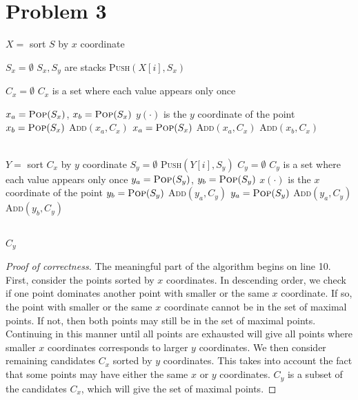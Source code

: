 \documentclass{article}
\begin{document}
\section*{Problem 3}
\begin{algorithm}[H]
\caption{Algorithm to compute the set of maximal points of S}
\begin{algorithmic}[1]
\State $X=$ sort $S$ by $x$ coordinate

\State $S_x=\emptyset$
	\Comment $S_x, S_y$ are stacks
	\State \textsc{Push}$(X[i],S_x)$
\EndFor

\State $C_x=\emptyset$
	\Comment $C_x$ is a set where each value appears only once

	\State $x_a=\textsc{Pop}(S_x)$, $x_b=\textsc{Pop}(S_x)$
		 \Comment $y(\cdot)$ is the $y$ coordinate of the point
			\State $x_b=\textsc{Pop}(S_x)$
		\Else
			\State \textsc{Add}$(x_a, C_x)$
			\State $x_a=\textsc{Pop}(S_x)$
		\EndIf
	\EndWhile
	\State \textsc{Add}$(x_a, C_x)$
		\State \textsc{Add}$(x_b, C_x)$
	\EndIf
	
	
\\
\State $Y=$ sort $C_x$ by $y$ coordinate
\State $S_y = \emptyset$
	\State \textsc{Push}$(Y[i],S_y)$
\EndFor
\State $C_y=\emptyset$ \Comment $C_y$ is a set where each value appears only once
	\State $y_a=\textsc{Pop}(S_y)$, $y_b=\textsc{Pop}(S_y)$
		 \Comment $x(\cdot)$ is the $x$ coordinate of the point
			\State $y_b=\textsc{Pop}(S_y)$
		\Else
			\State \textsc{Add}$(y_a, C_y)$
			\State $y_a=\textsc{Pop}(S_y)$
		\EndIf
	\EndWhile
	\State \textsc{Add}$(y_a, C_y)$
		\State \textsc{Add}$(y_b, C_y)$
	\EndIf

\\
\State \Return $C_y$



\EndFunction
\end{algorithmic}
\end{algorithm}

\begin{proof}[Proof of correctness]
The meaningful part of the algorithm begins on line 10. First, consider the points sorted by $x$ coordinates. In descending order, we check if one point dominates another point with smaller or the same $x$ coordinate. If so, the point with smaller or the same $x$ coordinate cannot be in the set of maximal points. If not, then both points may still be in the set of maximal points. Continuing in this manner until all points are exhausted will give all points where smaller $x$ coordinates corresponds to larger $y$ coordinates. We then consider remaining candidates $C_x$ sorted by $y$ coordinates. This takes into account the fact that some points may have either the same $x$ or $y$ coordinates. $C_y$ is a subset of the candidates $C_x$, which will give the set of maximal points.
\end{proof}
\end{document}
